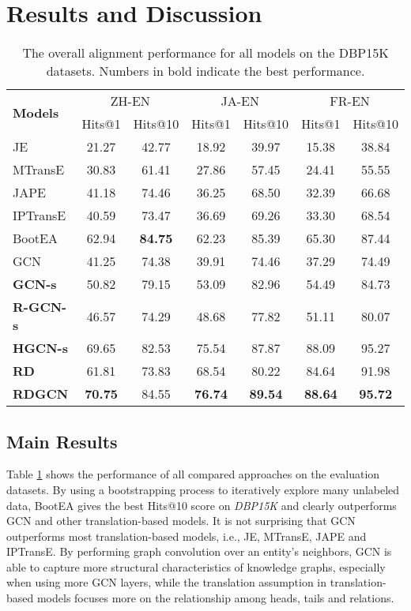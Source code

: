 \documentclass{article}
\begin{document}
\section{Results and Discussion\label{sec:results}}

\begin{table}[t!]
	\centering
	\small
	\begin{tabular}{l|cc|cc|cc}
		\toprule
		\multirow{2}{*}{\bf Models} & \multicolumn{2}{c|}{ZH-EN} & \multicolumn{2}{c|}{JA-EN} & \multicolumn{2}{c}{ FR-EN}  \\
		& \tiny Hits@1 & \tiny Hits@10 & \tiny Hits@1 &\tiny Hits@10 & \tiny Hits@1 &\tiny Hits@10\\
		\midrule
		JE & 21.27 & 42.77 & 18.92 & 39.97 & 15.38 & 38.84 \\
		MTransE & 30.83 & 61.41 & 27.86 & 57.45 & 24.41 & 55.55 \\
		JAPE & 41.18 & 74.46 & 36.25 & 68.50 & 32.39 & 66.68 \\
		IPTransE & 40.59 & 73.47 & 36.69 & 69.26 & 33.30 & 68.54 \\
		BootEA  & 62.94 & \bf 84.75 & 62.23 & 85.39 & 65.30 & 87.44 \\
		GCN & 41.25 & 74.38 & 39.91 & 74.46 & 37.29 & 74.49 \\
		\midrule
		\bf GCN-s & 50.82 & 79.15 & 53.09 & 82.96 & 54.49 & 84.73 \\
		\bf R-GCN-s& 46.57 & 74.29 & 48.68 & 77.82 & 51.11 & 80.07 \\
		\bf HGCN-s & 69.65 & 82.53 & 75.54 & 87.87 & 88.09 & 95.27 \\
		\bf RD & 61.81 & 73.83 & 68.54 & 80.22 & 84.64 & 91.98 \\
		\bf RDGCN & \bf 70.75 &  84.55 & \bf 76.74 & \bf 89.54 & \bf 88.64 & \bf 95.72 \\
		\bottomrule
	\end{tabular}
	\caption{The overall alignment performance for all models on the DBP15K datasets. Numbers in bold indicate the best performance.}
	\label{cross}
\end{table}



\subsection{Main Results\label{overall}}
Table \ref{cross} shows the performance of all compared approaches on the evaluation datasets. By using a bootstrapping process to
iteratively explore many unlabeled data, BootEA gives the best Hits@10 score on \textit{DBP15K} and clearly outperforms GCN and other translation-based models.
It is not surprising that GCN outperforms most translation-based models, i.e., JE, MTransE, JAPE and IPTransE.
By performing graph convolution over an entity's neighbors, GCN is able to capture more structural characteristics of knowledge graphs, especially when using more GCN layers, while the translation assumption in translation-based models focuses more on the relationship among heads, tails and relations.
\end{document}
